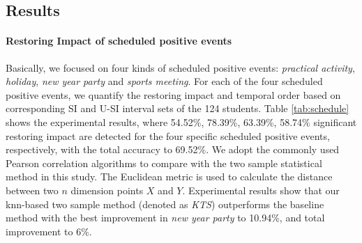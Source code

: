 \subsection{Results}
\paragraph{Restoring Impact of scheduled positive events}
Basically, we focused on four kinds of scheduled positive events:
\emph{practical activity}, \emph{holiday}, \emph{new year party} and \emph{sports meeting}.
For each of the four scheduled positive events,
we quantify the restoring impact and temporal order
based on corresponding SI and U-SI interval sets of the 124 students.
Table \ref{tab:schedule} shows the experimental results,
where 54.52\%, 78.39\%, 63.39\%, 58.74\% significant restoring impact are detected for the four specific scheduled positive events, respectively, with the total accuracy to 69.52\%.
We adopt the commonly used Pearson correlation algorithms to compare with the two sample statistical method in this study.
The Euclidean metric is used to calculate the distance between two $n$ dimension points $X$ and $Y$.
Experimental results show that our knn-based two sample method (denoted as \emph{KTS}) outperforms the baseline method
with the best improvement in \emph{new year party} to 10.94\%,
and total improvement to 6\%.

\begin{table}[H]
\begin{center}
\caption{\small{Quantify the impact of scheduled positive school events using KTS (the knn-based two sample method adopted in this research) and baseline method.}}
\label{tab:schedule}
\end{center}
\end{table}

